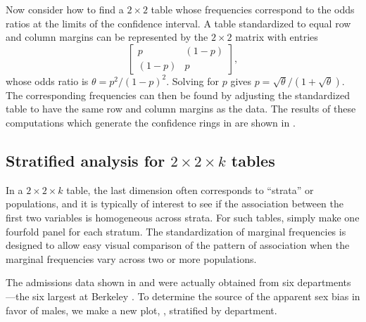 \documentclass[10pt,krantz2]{krantz}\usepackage[]{graphicx}\usepackage[]{color}
\begin{document}
Now consider how to find a \(2 \times  2\) table whose frequencies
correspond to the odds ratios at the limits of the confidence
interval.  A table standardized to equal row and column margins can
be represented by the \(2 \times  2\) matrix with entries
\begin{equation*}
 \left[
  \begin{array}{cc}
   p & (1-p) \\
  (1-p) & p
  \end{array}
 \right]
 \comma
\end{equation*}
whose odds ratio is \(\theta  =  p^2 /  ( 1  -  p)^2\).
Solving for $p$ gives \(p  =  \sqrt \theta /  ( 1  +  \sqrt \theta )\).  The
corresponding frequencies can then be found by adjusting the
standardized table to have the same row and column margins as the
data. The results of these computations which generate the confidence
rings in  are shown in .





\subsection{Stratified analysis for $2 \times 2 \times k$ tables}\label{sec:twoway-fourstrat}
In a \(2 \times  2 \times  k\)
table, the last dimension often corresponds to ``strata'' or
populations, and it is typically of interest to see if the
association between the first two variables is homogeneous across
strata.  For such tables, simply make one fourfold panel for each
stratum.  The standardization of marginal frequencies is designed to
allow easy visual comparison of the pattern of association
when the marginal frequencies vary across two
or more populations.

The admissions data shown in
 and  were actually obtained
from six departments---the six largest at Berkeley
\citep{Bickel-etal:75}.
To determine the source of the apparent sex
bias in favor of males, we make a new plot, ,
stratified by department.
\end{document}
